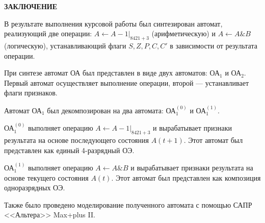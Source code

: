 
\newpage
\begin{center}
\textbf{ЗАКЛЮЧЕНИЕ}
\end{center}

В результате выполнения курсовой работы был синтезирован автомат, реализующий две операции: $A \leftarrow A - 1|_{8421+3}$ (арифметическую) и $A \leftarrow A \& B$ (логическую), устанавливающий флаги $S, Z, P, C, C'$ в зависимости от результата операции.

При синтезе автомат ОА был представлен в виде двух автоматов: ОА$_1$ и ОА$_2$. Первый автомат осуществляет выполнение операции, второй --- устанавливает флаги признаков.

Автомат ОА$_1$ был декомпозирован на два автомата: ОА$^{(0)}_{1}$ и ОА$^{(1)}_{1}$. 

ОА$^{(0)}_{1}$ выполняет операцию $A \leftarrow A - 1|_{8421+3}$ и вырабатывает признаки результата на основе последующего состояния $A(t+1)$. Этот автомат был представлен как единый 4-разрядный ОЭ.

ОА$^{(1)}_{1}$ выполняет операцию $A \leftarrow A \& B$ и вырабатывает признаки результата на основе текущего состояния $A(t)$. Этот автомат был представлен как композиция одноразрядных ОЭ.

Также было проведено моделирование полученного автомата с помощью САПР <<Альтера>> Max+plus II.
